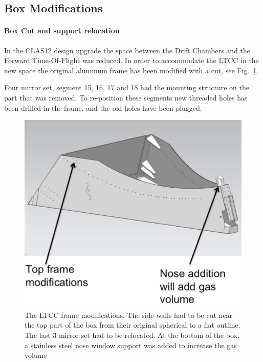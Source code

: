 \subsection{Box Modifications}



\paragraph{Box Cut and support relocation }

In the CLAS12 design upgrade the space between the Drift Chambers and the Forward Time-Of-Flight was reduced.
In order to accommodate the LTCC in the new space the original aluminum frame has been modified with a cut, see Fig.~\ref{fig:boxCut}.

Four mirror set, segment 15, 16, 17 and 18 had the mounting structure on the part that was removed.
To re-position these segments new threaded holes has been drilled in the frame, and the old holes have been plugged.

\begin{figure}[hbt]
	\centering
	\includegraphics[width=1.0\columnwidth,keepaspectratio]{img/boxCut.png}
	\caption{The LTCC frame modifications. The side-walls had to be cut near the top part of the box from their original
            spherical to a flat outline. The last 3 mirror set had to be relocated. At the bottom of the box, a stainless steel
            nose window support was added to increase the gas volume}
	\label{fig:boxCut}
\end{figure}


